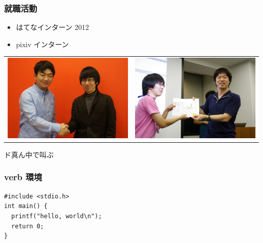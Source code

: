 \documentclass[dvipdfm,cjk,14pt,hyperref={bookmarks=false,compress,slidestop}]{beamer}
\begin{document}
\begin{frame}
 \frametitle{就職活動}
 \begin{itemize}
  \item はてなインターン 2012
  \item pixiv インターン
 \end{itemize}
 \vspace{-20pt}
 \begin{center}
  \begin{tabular}{cc}
   \includegraphics[clip, height=38truemm]{pixiv} & \includegraphics[clip, height=38truemm]{hatena} \\ 
  \end{tabular}
 \end{center}
\end{frame}

\begin{frame}[plain]
 \begin{center}
  \LARGE ド真ん中で叫ぶ
 \end{center}
\end{frame}

\begin{frame}[containsverbatim]
 \frametitle{verb 環境}

\begin{verbatim}
#include <stdio.h>
int main() {
  printf("hello, world\n");
  return 0;
}
\end{verbatim}

\end{frame}
\end{document}
